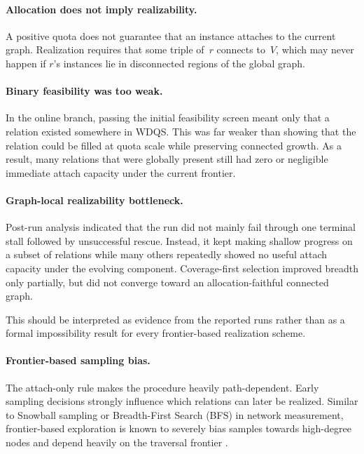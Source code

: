 \documentclass[12pt,a4paper]{article}
\begin{document}
\paragraph{Allocation does not imply realizability.} A positive quota does not guarantee that an instance attaches to the current graph. Realization requires that some triple of~$r$ connects to~$V$, which may never happen if \(r\)'s instances lie in disconnected regions of the global graph.

\paragraph{Binary feasibility was too weak.} In the online branch, passing the initial feasibility screen meant only that a relation existed somewhere in WDQS. This was far weaker than showing that the relation could be filled at quota scale while preserving connected growth. As a result, many relations that were globally present still had zero or negligible immediate attach capacity under the current frontier.

\paragraph{Graph-local realizability bottleneck.} Post-run analysis indicated that the run did not mainly fail through one terminal stall followed by unsuccessful rescue. Instead, it kept making shallow progress on a subset of relations while many others repeatedly showed no useful attach capacity under the evolving component. Coverage-first selection improved breadth only partially, but did not converge toward an allocation-faithful connected graph.

\noindent This should be interpreted as evidence from the reported runs rather than as a formal impossibility result for every frontier-based realization scheme.

\paragraph{Frontier-based sampling bias.} The attach-only rule makes the procedure heavily path-dependent. Early sampling decisions strongly influence which relations can later be realized. Similar to Snowball sampling or Breadth-First Search (BFS) in network measurement, frontier-based exploration is known to severely bias samples towards high-degree nodes and depend heavily on the traversal frontier \cite{kurant2010bias, leskovec2006sampling}.
\end{document}
